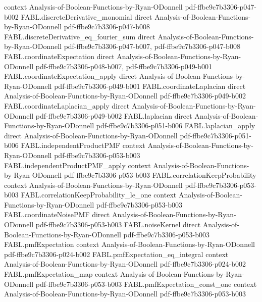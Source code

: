 \begin{theorem}
  {context}
  {Analysis-of-Boolean-Functions-by-Ryan-ODonnell}
  {pdf-ffbe9c7b3306-p047-b002}
\proofstep
  {FABL.discreteDerivative_monomial}
  {direct}
  {Analysis-of-Boolean-Functions-by-Ryan-ODonnell}
  {pdf-ffbe9c7b3306-p047-b008}
\proofstep
  {FABL.discreteDerivative_eq_fourier_sum}
  {direct}
  {Analysis-of-Boolean-Functions-by-Ryan-ODonnell}
  {pdf-ffbe9c7b3306-p047-b007,
    pdf-ffbe9c7b3306-p047-b008}
\proofstep
  {FABL.coordinateExpectation}
  {direct}
  {Analysis-of-Boolean-Functions-by-Ryan-ODonnell}
  {pdf-ffbe9c7b3306-p048-b007,
    pdf-ffbe9c7b3306-p049-b001}
\proofstep
  {FABL.coordinateExpectation_apply}
  {direct}
  {Analysis-of-Boolean-Functions-by-Ryan-ODonnell}
  {pdf-ffbe9c7b3306-p049-b001}
\proofstep
  {FABL.coordinateLaplacian}
  {direct}
  {Analysis-of-Boolean-Functions-by-Ryan-ODonnell}
  {pdf-ffbe9c7b3306-p049-b002}
\proofstep
  {FABL.coordinateLaplacian_apply}
  {direct}
  {Analysis-of-Boolean-Functions-by-Ryan-ODonnell}
  {pdf-ffbe9c7b3306-p049-b002}
\proofstep
  {FABL.laplacian}
  {direct}
  {Analysis-of-Boolean-Functions-by-Ryan-ODonnell}
  {pdf-ffbe9c7b3306-p051-b006}
\proofstep
  {FABL.laplacian_apply}
  {direct}
  {Analysis-of-Boolean-Functions-by-Ryan-ODonnell}
  {pdf-ffbe9c7b3306-p051-b006}
\proofstep
  {FABL.independentProductPMF}
  {context}
  {Analysis-of-Boolean-Functions-by-Ryan-ODonnell}
  {pdf-ffbe9c7b3306-p053-b003}
\proofstep
  {FABL.independentProductPMF_apply}
  {context}
  {Analysis-of-Boolean-Functions-by-Ryan-ODonnell}
  {pdf-ffbe9c7b3306-p053-b003}
\proofstep
  {FABL.correlationKeepProbability}
  {context}
  {Analysis-of-Boolean-Functions-by-Ryan-ODonnell}
  {pdf-ffbe9c7b3306-p053-b003}
\proofstep
  {FABL.correlationKeepProbability_le_one}
  {context}
  {Analysis-of-Boolean-Functions-by-Ryan-ODonnell}
  {pdf-ffbe9c7b3306-p053-b003}
\proofstep
  {FABL.coordinateNoisePMF}
  {direct}
  {Analysis-of-Boolean-Functions-by-Ryan-ODonnell}
  {pdf-ffbe9c7b3306-p053-b003}
\proofstep
  {FABL.noiseKernel}
  {direct}
  {Analysis-of-Boolean-Functions-by-Ryan-ODonnell}
  {pdf-ffbe9c7b3306-p053-b003}
\proofstep
  {FABL.pmfExpectation}
  {context}
  {Analysis-of-Boolean-Functions-by-Ryan-ODonnell}
  {pdf-ffbe9c7b3306-p024-b002}
\proofstep
  {FABL.pmfExpectation_eq_integral}
  {context}
  {Analysis-of-Boolean-Functions-by-Ryan-ODonnell}
  {pdf-ffbe9c7b3306-p024-b002}
\proofstep
  {FABL.pmfExpectation_map}
  {context}
  {Analysis-of-Boolean-Functions-by-Ryan-ODonnell}
  {pdf-ffbe9c7b3306-p053-b003}
\proofstep
  {FABL.pmfExpectation_const_one}
  {context}
  {Analysis-of-Boolean-Functions-by-Ryan-ODonnell}
  {pdf-ffbe9c7b3306-p053-b003}

\end{theorem}
